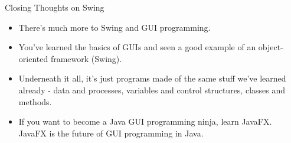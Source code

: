 \documentclass{beamer}
\begin{document}
\begin{frame}[fragile]{Closing Thoughts on Swing}


\begin{itemize}
\item There's much more to Swing and GUI programming.
\item You've learned the basics of GUIs and seen a good example of an object-oriented framework (Swing).
\item Underneath it all, it's just programs made of the same stuff we've learned already - data and processes, variables and control structures, classes and methods.
\item If you want to become a Java GUI programming ninja, learn JavaFX.  JavaFX is the future of GUI programming in Java.
\end{itemize}


\end{frame}









\end{document}
